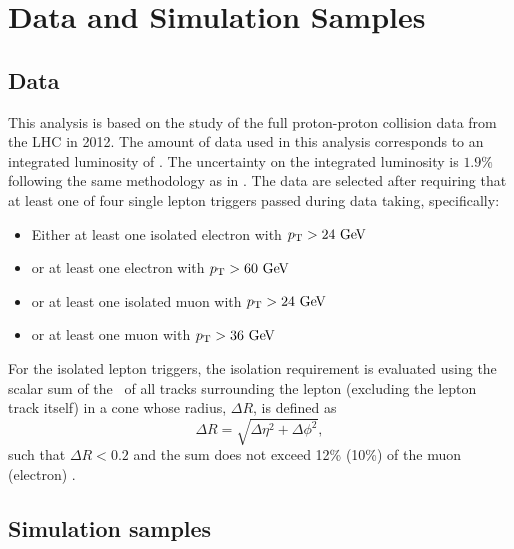 \section{Data and Simulation Samples}
\subsection{Data}
\label{sec:subsection_data}


This analysis is based on the study of the full proton-proton collision
data from the LHC in 2012. The amount 
of data used in this analysis corresponds to 
an integrated luminosity of \lumi.
The uncertainty on the integrated luminosity is $1.9\%$ 
following the same methodology as in \cite{Aad:2013ucp}.
The data are selected after requiring that at least one
of four single lepton triggers passed during data taking, 
specifically:
\begin{itemize}
\item[] Either at least one isolated electron with $\pt > 24 \GeV$
\item[] or at least one electron with $\pt > 60 \GeV$
\item[] or at least one isolated muon with $\pt > 24 \GeV$
\item[] or at least one muon with $\pt > 36 \GeV$
\end{itemize}
For the isolated lepton triggers, the isolation requirement is evaluated 
using the scalar sum of the \pt~of all tracks surrounding the lepton 
(excluding the lepton track itself) in a cone whose radius, $\Delta R$,
is defined as
\begin{equation}
\Delta R = \sqrt{\Delta \eta ^2 + \Delta \phi ^2},
\label{eq:deltar}
\end{equation}
such that $\Delta R < 0.2$ 
and the sum does not exceed 12\% (10\%) of the muon (electron)  \pt.


\subsection{Simulation samples}


